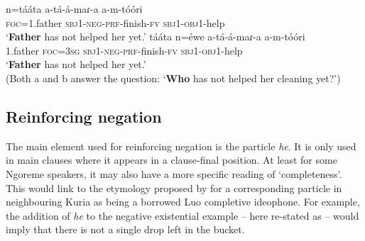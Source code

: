 \documentclass[output=paper,colorlinks,citecolor=brown,draftmode]{langscibook}
\begin{document}
\ea\label{ex:ngo:80}
    \ea\label{ex:ngo:80a}
        \gll n=tááta a{}-tá{}-á{}-maɾ{}-a a{}-m{}-tóóri\\
             \textsc{foc}=1.father \textsc{sbj1-neg-prf}{}-finish-\textsc{fv} \textsc{sbj1-obj}1-help\\
        \glt ‘\textbf{Father} has not helped her yet.’
    \ex\label{ex:ngo:80b}
        \gll tááta n=éwe a{}-tá{}-á{}-maɾ{}-a a{}-m{}-tóóri\\
             1.father \textsc{foc=}3\textsc{sg} \textsc{sbj1-neg-prf}{}-finish-\textsc{fv} \textsc{sbj1-obj}1-help\\
        \glt ‘\textbf{Father} has not helped her yet.’\\
        \medskip(Both a and b answer the question: ‘\textbf{Who} has not helped her cleaning yet?')
    \z
\z 

       

\subsection{Reinforcing negation}\label{sec:ngo:4.4}

The main element used for reinforcing negation is the particle \textit{he}. It is only used in main clauses where it appears in a clause-final position. At least for some Ngoreme speakers, it may also have a more specific reading of ‘completeness’. This would link to the etymology proposed by \citet{Rose2001} for a corresponding particle in neighbouring Kuria as being a borrowed Luo completive ideophone. For example, the addition of \textit{he} to the negative existential example  – here re-stated as  – would imply that there is not a single drop left in the bucket. 
\end{document}
